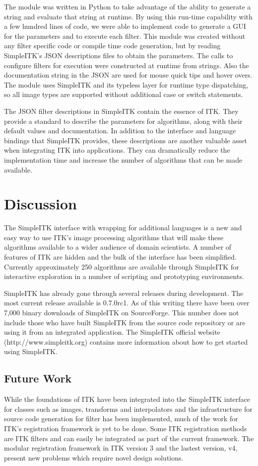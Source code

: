 \documentclass{frontiersMED} %
\begin{document}
The module was written in Python to take advantage of the ability
to generate a string and evaluate that string at runtime.
By using this run-time capability with a few hundred lines of
code, we were able to implement code to generate a GUI for the
parameters and to execute each filter. This module was created without any
filter specific code or compile time code generation, but by
reading SimpleITK's JSON descriptions files to obtain the
parameters. The calls to configure filters for execution were
constructed at runtime from strings. Also the documentation
string in the JSON are used for mouse quick tips and hover overs. The
module uses SimpleITK and its typeless layer for runtime type
dispatching, so all image types are supported without additional case
or switch statements.

The JSON filter descriptions in SimpleITK contain the essence of
ITK. They provide a standard to describe the parameters for
algorithms, along with their default values and documentation. In
addition to the interface and language bindings that SimpleITK provides,
these descriptions are another valuable asset when integrating ITK into
applications.  They can dramatically reduce the implementation time and
increase the number of algorithms that can be made available.

\section{Discussion}
The SimpleITK interface with wrapping for additional languages is a new
and easy way to use ITK's image processing algorithms that will
make these algorithms available to a wider audience of domain scientists.
A number of features of ITK are hidden and the bulk of
the interface has been simplified. Currently approximately 250
algorithms are available through SimpleITK for interactive
exploration in a number of scripting and prototyping environments.

SimpleITK has already gone through several releases during
development. The most current release available is 0.7.0rc1. As of
this writing there have been over 7,000 binary downloads of SimpleITK
on SourceForge. This number does not include those who have built SimpleITK
from the source code repository or are using it from an integrated
application. The SimpleITK official website (http://www.simpleitk.org)
contains more information about how to get started using SimpleITK.

\subsection{Future Work}
While the foundations of ITK have been integrated into the SimpleITK
interface for classes such as images, transforms and interpolators and the
infrastructure for source code generation for filter has been
implemented, much of the work for ITK's registration framework is yet
to be done. Some ITK registration methods are ITK filters and can easily
be integrated as part of the current framework. The modular
registration framework in ITK version 3 and the lastest version, v4,
present new problems which require novel design solutions.
\end{document}

